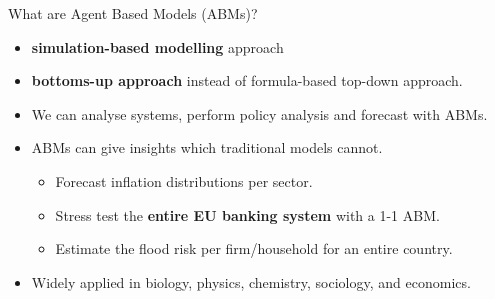 \documentclass[9pt]{beamer}
\begin{document}
\begin{frame}{What are Agent Based Models (ABMs)?}
    \begin{itemize}
        \item<1-> \textbf{simulation-based modelling} approach
        \item<2-> \textbf{bottoms-up approach} instead of formula-based top-down approach.
        \item<3->  We can analyse systems, perform policy analysis and forecast with ABMs.
        \item<4-> ABMs can give insights which traditional models cannot.
        \begin{itemize}
            \item<5-> Forecast inflation distributions per sector.
            \item<6-> Stress test the \textbf{entire EU banking system} with a 1-1 ABM.
            \item<7-> Estimate the flood risk per firm/household for an entire country.
        \end{itemize}
        \item<8-> Widely applied in biology, physics, chemistry, sociology, and economics.
    \end{itemize}

\end{frame}
\end{document}
